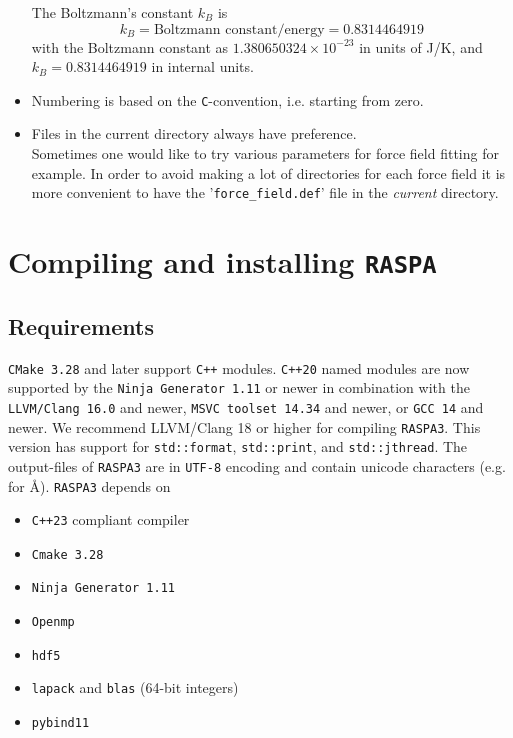 \begin{itemize}
\noindent
The Boltzmann's constant $k_B$ is
\begin{equation}
 k_B=\text{Boltzmann constant}/\text{energy}=0.8314464919
\end{equation}
with the Boltzmann constant as $1.380650324\times10^{-23}$ in units of J/K, and $k_B=0.8314464919$ in internal units.

\item{Numbering is based on the \texttt{C}-convention, i.e. starting from zero.}
\item{Files in the current directory always have preference.}\\
Sometimes one would like to try various parameters for force field fitting for example. In order to avoid
making a lot of directories for each force field it is more convenient to have the 
'\texttt{force\_field.def}' file in the \emph{current} directory.
\end{itemize}

\section{Compiling and installing \texttt{RASPA}}

\subsection{Requirements}

\texttt{CMake 3.28} and later support \texttt{C++} modules. 
\texttt{C++20} named modules are now supported by the \texttt{Ninja Generator 1.11} or newer in combination 
with the \texttt{LLVM/Clang 16.0} and newer, \texttt{MSVC toolset 14.34} and newer, or \texttt{GCC 14} and newer. 
We recommend LLVM/Clang 18 or higher for compiling \texttt{RASPA3}. This version has support 
for \verb+std::format+, \verb+std::print+, and \verb+std::jthread+. 
The output-files of \texttt{RASPA3} are in \texttt{UTF-8} encoding and contain unicode characters (e.g. for \AA).
\texttt{RASPA3} depends on
\begin{itemize}
  \item{\texttt{C++23} compliant compiler}
  \item{\texttt{Cmake 3.28}}
  \item{\texttt{Ninja Generator 1.11}}
  \item{\texttt{Openmp}}
  \item{\texttt{hdf5}}
  \item{\texttt{lapack} and \texttt{blas} (64-bit integers)}
  \item{\texttt{pybind11}}
\end{itemize}

